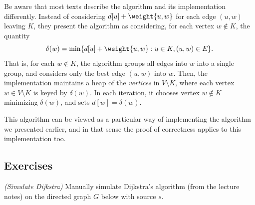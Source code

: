 Be aware that most texts describe the algorithm and its implementation differently.
Instead of considering $d[u] + \weight {u, w}$ for each edge $(u, w)$ leaving $K$,
they present the algorithm as considering, for each vertex $w\not\in K$,
the quantity
\[ \delta(w) = \min \{ d[u] + \weight {u, w} : u\in K, (u, w)\in E\}. \]
That is, for each $w\not\in K$,
the algorithm groups all edges into $w$ into a single group,
and considers only the best edge $(u, w)$ into $w$.
Then, the implementation maintains a heap of the \emph{vertices} in $V\setminus K$,
where each vertex $w\in V\setminus K$ is keyed by $\delta (w)$.
In each iteration, it chooses vertex $w\not\in K$ minimizing $\delta(w)$,
and sets $d[w] = \delta(w)$.

This algorithm can be viewed as a particular way of implementing the algorithm we presented earlier,
and in that sense the proof of correctness applies to this implementation too.


\subsection{Exercises}

\exercise\label{greedy: exercise: simulate Dijkstra}\emph{(Simulate Dijkstra)} %
Manually simulate Dijkstra's algorithm (from the lecture notes) on the directed graph $G$ below with source $s$.
\begin{center}
\end{center}

